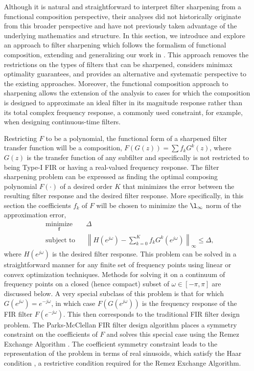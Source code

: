 \documentclass[journal] {IEEEtran}
\begin{document}
Although it is natural and straightforward to interpret filter sharpening from a functional composition perspective, their analyses did not historically originate from this broader perspective and have not previously taken advantage of the underlying mathematics and structure. In this section, we introduce and explore an approach to filter sharpening which follows the formalism of functional composition, extending and generalizing our work in \cite{DemirtasAllerton2013}. This approach removes the restrictions on the types of filters that can be sharpened, considers minimax optimality guarantees, and provides an alternative and systematic perspective to the existing approaches. Moreover, the functional composition approach to sharpening allows the extension of the analysis to cases for which the composition is designed to approximate an ideal filter in its magnitude response rather than its total complex frequency response, a commonly used constraint, for example, when designing continuous-time filters.

Restricting $F$ to be a polynomial, the functional form of a sharpened filter transfer function will be a composition, $F(G(z))=\sum{f_kG^k(z)}$, where $G(z)$ is the transfer function of any subfilter and specifically is not restricted to being Type-I FIR or having a real-valued frequency response. The filter sharpening problem can be expressed as finding the optimal composing polynomial $F(\cdot)$ of a desired order $K$ that minimizes the error between the resulting filter response and the desired filter response. More specifically, in this section the coefficients $f_k$ of $F$ will be chosen to minimize the $\l_{\infty}$ norm of the approximation error,
\begin{equation}\label{eqn:freqresp::filter_sharp_optim}
\begin{aligned}
& \underset{\mathbf{f}}{\text{minimize}}
& & \Delta \\
& \text{subject to}
& &\left\|H(e^{j\omega})-\sum_{k=0}^K f_k G^k(e^{j\omega})\right\|_{\infty}\le \Delta,
\end{aligned}
\end{equation}
where $H(e^{j\omega})$ is the desired filter response. This problem can be solved in a straightforward manner for any finite set of frequency points using linear or convex optimization techniques. Methods for solving it on a continuum of frequency points on a closed (hence compact) subset of $\omega \in [-\pi,\pi]$ are discussed below. A very special subclass of this problem is that for which $G(e^{j\omega})=e^{-j\omega}$, in which case $F(G(e^{j\omega}))$ is the frequency response of the FIR filter $F(e^{-j\omega})$. This then corresponds to the traditional FIR filter design problem. The Parks-McClellan FIR filter design algorithm \cite{Parks1972} places a symmetry constraint on the coefficients of $F$ and solves this special case using the Remez Exchange Algorithm \cite{Cheney1966}. The coefficient symmetry constraint leads to the representation of the problem in terms of real sinusoids, which satisfy the Haar condition \cite{Cheney1966, Meinardus1967}, a restrictive condition required for the Remez Exchange Algorithm.
\end{document}
